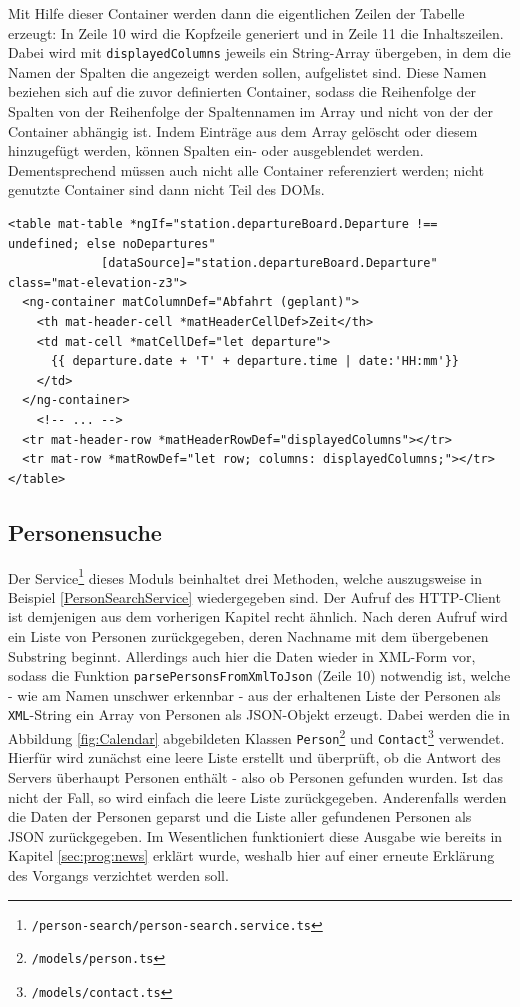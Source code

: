 Mit Hilfe dieser Container werden dann die eigentlichen Zeilen der Tabelle erzeugt: In Zeile 10 wird die Kopfzeile generiert und in Zeile 11 die Inhaltszeilen. Dabei wird mit \texttt{displayedColumns} jeweils ein String-Array übergeben, in dem die Namen der Spalten die angezeigt werden sollen, aufgelistet sind. Diese Namen beziehen sich auf die zuvor definierten Container, sodass die Reihenfolge der Spalten von der Reihenfolge der Spaltennamen im Array und nicht von der der Container abhängig ist. Indem Einträge aus dem Array gelöscht oder diesem hinzugefügt werden, können Spalten ein- oder ausgeblendet werden. Dementsprechend müssen auch nicht alle Container referenziert werden; nicht genutzte Container sind dann nicht Teil des \acsp{DOM}.

\begin{lstlisting}[float, floatplacement=h, style=htmlcssjs, caption={Tabelle der Abfahrtszeiten}, label={Departures}]
<table mat-table *ngIf="station.departureBoard.Departure !== undefined; else noDepartures"
             [dataSource]="station.departureBoard.Departure" class="mat-elevation-z3">
  <ng-container matColumnDef="Abfahrt (geplant)">
    <th mat-header-cell *matHeaderCellDef>Zeit</th>
    <td mat-cell *matCellDef="let departure">
      {{ departure.date + 'T' + departure.time | date:'HH:mm'}}
    </td>
  </ng-container>
    <!-- ... -->
  <tr mat-header-row *matHeaderRowDef="displayedColumns"></tr>
  <tr mat-row *matRowDef="let row; columns: displayedColumns;"></tr>
</table>
\end{lstlisting}
\subsection{Personensuche}
\label{sec:prog:searchPerson}
Der Service\footnote{\texttt{/person-search/person-search.service.ts}} dieses Moduls beinhaltet drei Methoden, welche auszugsweise in Beispiel \ref{PersonSearchService} wiedergegeben sind. Der Aufruf des \acs{HTTP}-Client ist demjenigen aus dem vorherigen Kapitel recht ähnlich. Nach deren Aufruf wird ein Liste von Personen zurückgegeben, deren Nachname mit dem übergebenen Substring beginnt. Allerdings auch hier die Daten wieder in \acs{XML}-Form vor, sodass die Funktion \texttt{parsePersonsFromXmlToJson} (Zeile 10) notwendig ist, welche - wie am Namen unschwer erkennbar - aus der erhaltenen Liste der Personen als \texttt{XML}-String ein Array von Personen als \acs{JSON}-Objekt erzeugt. Dabei werden die in Abbildung \ref{fig:Calendar} abgebildeten Klassen \texttt{Person}\footnote{\texttt{/models/person.ts}} und \texttt{Contact}\footnote{\texttt{/models/contact.ts}} verwendet. Hierfür wird zunächst eine leere Liste erstellt und überprüft, ob die Antwort des Servers überhaupt Personen enthält - also ob Personen gefunden wurden. Ist das nicht der Fall, so wird einfach die leere Liste zurückgegeben. Anderenfalls werden die Daten der Personen geparst und die Liste aller gefundenen Personen als \acs{JSON} zurückgegeben. Im Wesentlichen funktioniert diese Ausgabe wie bereits in Kapitel \ref{sec:prog:news} erklärt wurde, weshalb hier auf einer erneute Erklärung des Vorgangs verzichtet werden soll.

